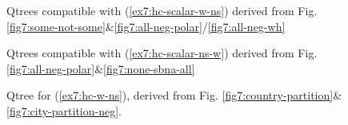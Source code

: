 \begin{figure}[H]
	\centering
	\caption{Qtrees compatible with (\ref{ex7:hc-scalar-w-ns}) derived from Fig. \ref{fig7:some-not-some}\&\ref{fig7:all-neg-polar}/\ref{fig7:all-neg-wh}}\label{fig7:if-some-then-not-all}%
\end{figure}

\begin{figure}[H]
	\centering
	\caption{Qtrees compatible with (\ref{ex7:hc-scalar-ns-w}) derived from Fig. \ref{fig7:all-neg-polar}\&\ref{fig7:none-sbna-all}}\label{fig7:if-not-all-then-some}%
\end{figure}

\begin{figure}[H]
	\centering
	\caption{Qtree for (\ref{ex7:hc-w-ns}), derived from Fig. \ref{fig7:country-partition}\&\ref{fig7:city-partition-neg}.}\label{fig7:hc-non-scalar-w-ns}
\end{figure}


